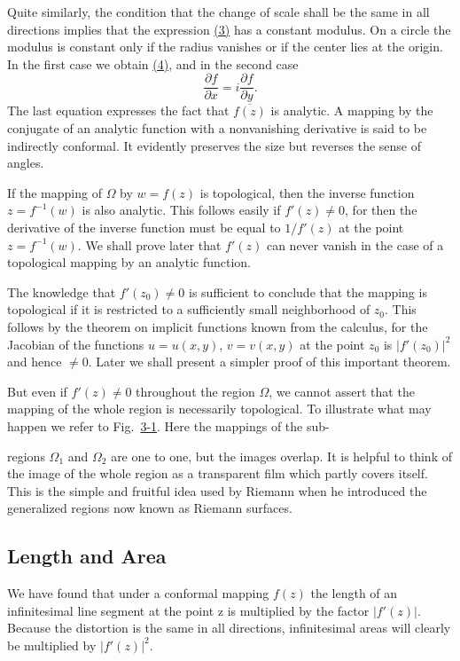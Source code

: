 Quite similarly, the condition that the change of scale shall be the same in all directions implies that the expression \hyperref[eq:3.3]{(3)} has a constant modulus. On a circle the modulus is constant only if the radius vanishes or if the center lies at the origin. In the first case we obtain \hyperref[eq:3.4]{(4)}, and in the second case
\begin{equation*}
\frac {\partial f}{\partial x} = i \frac {\partial f}{\partial y}.
\end{equation*}
The last equation expresses the fact that $\overline{f(z)}$ is analytic. A mapping by the conjugate of an analytic function with a nonvanishing derivative is said to be indirectly conformal. It evidently preserves the size but reverses the sense of angles.

If the mapping of $\Omega$ by $w = f(z)$ is topological, then the inverse function $z = f^{-1}(w)$ is also analytic. This follows easily if $f'(z) \neq 0$, for then the derivative of the inverse function must be equal to $1/f'(z)$ at the point $z = f^{-1}(w)$. We shall prove later that $f'(z)$ can never vanish in the case of a topological mapping by an analytic function.

The knowledge that $f'(z_0) \neq 0$ is sufficient to conclude that the mapping is topological if it is restricted to a sufficiently small neighborhood of $z_0$. This follows by the theorem on implicit functions known from the calculus, for the Jacobian of the functions $u = u(x,y)$, $v = v(x,y)$ at the point $z_0$ is $|f'(z_0)|^2$ and hence $\neq 0$. Later we shall present a simpler proof of this important theorem.

But even if $f'(z) \neq 0$ throughout the region $\Omega$, we cannot assert that the mapping of the whole region is necessarily topological. To illustrate
what may happen we refer to Fig.~\hyperref[fig:3-1]{3-1}. Here the mappings of the sub-

regions $\Omega_{1}$ and $\Omega_{2}$ are one to one, but the images overlap. It is helpful to think of the image of the whole region as a transparent film which partly covers itself. This is the simple and fruitful idea used by Riemann when he introduced the generalized regions now known as Riemann surfaces.

\setcounter{section}{2}\setcounter{subsection}{3}\subsection{Length and Area}\label{sec:3.2.4}
We have found that under a conformal mapping $f(z)$ the length of an infinitesimal line segment at the point z is multiplied by the factor $|f'(z)|$. Because the distortion is the same in all directions, infinitesimal areas will clearly be multiplied by $|f'(z)|^{2}$.

